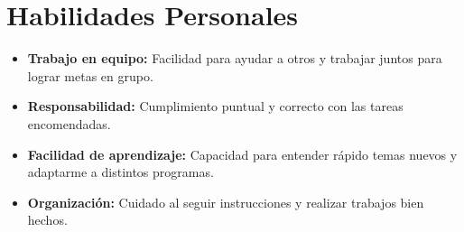\documentclass[11pt,a4paper]{article}
\begin{document}
\section{Habilidades Personales}
\begin{itemize}[leftmargin=1.5em, itemsep=4pt]
    \item \textbf{Trabajo en equipo:} Facilidad para ayudar a otros y trabajar juntos para lograr metas en grupo.
    \item \textbf{Responsabilidad:} Cumplimiento puntual y correcto con las tareas encomendadas.
    \item \textbf{Facilidad de aprendizaje:} Capacidad para entender rápido temas nuevos y adaptarme a distintos programas.
    \item \textbf{Organización:} Cuidado al seguir instrucciones y realizar trabajos bien hechos.
\end{itemize}
\end{document}
